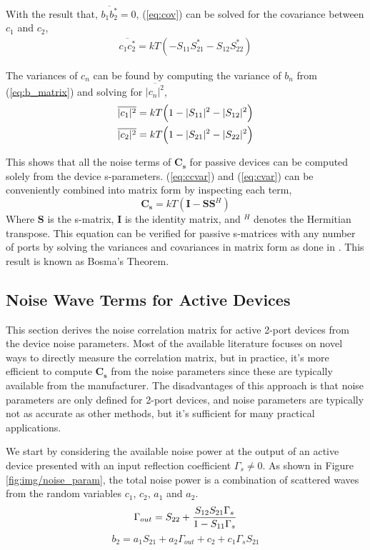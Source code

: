 \documentclass[journal]{IEEEtran}
\begin{document}
With the result that, \(\overline{b_1 b_2^*} = 0\), (\ref{eq:cov}) can be solved for the covariance between \(c_1\) and \(c_2\),
\begin{gather}
\overline{c_1c_2^*} = kT\left( -S_{11}S_{21}^* - S_{12}S_{22}^*\right) \label{eq:ccvar}
\end{gather}

The variances of \(c_n\) can be found by computing the variance of \(b_n\) from (\ref{eq:b_matrix}) and solving for \(\overline{|c_n|^2}\),
\begin{gather}
	\overline{|c_1|^2} = kT\Big(1- |S_{11}|^2 - |S_{12}|^2\Big) \notag \\
	\overline{|c_2|^2} = kT\Big(1- |S_{21}|^2 - |S_{22}|^2\Big) \label{eq:cvar}
\end{gather}

This shows that all the noise terms of \(\mathbf{C_s}\) for passive devices can be computed solely from the device s-parameters. (\ref{eq:ccvar}) and (\ref{eq:cvar}) can be conveniently combined into matrix form by inspecting each term,
\[\mathbf{C_s} = kT ( \mathbf{I} - \mathbf{S}\mathbf{S}^H ) \]
Where \(\mathbf{S}\) is the s-matrix, \(\mathbf{I}\) is the identity matrix, and \(^H\) denotes the Hermitian transpose. This equation can be verified for passive s-matrices with any number of ports by solving the variances and covariances in matrix form as done in \cite{b7}. This result is known as Bosma's Theorem. \cite{b6}


\subsection{Noise Wave Terms for Active Devices}
This section derives the noise correlation matrix for active 2-port devices from the device noise parameters. Most of the available literature focuses on novel ways to directly measure the correlation matrix, but in practice, it's more efficient to compute \(\mathbf{C_s}\) from the noise parameters since these are typically available from the manufacturer. The disadvantages of this approach is that noise parameters are only defined for 2-port devices, and noise parameters are typically not as accurate as other methods, but it's sufficient for many practical applications.

We start by considering the available noise power at the output of an active device presented with an input reflection coefficient \(\Gamma_s \neq 0\). As shown in Figure \ref{fig:img/noise_param}, the total noise power is a combination of scattered waves from the random variables \(c_1\), \(c_2\), \(a_1\) and \(a_2\).
\texenv\figure[file=img/noise_param, caption={\small Output noise from an RF amplifier when presented with a input reflection \(\Gamma_s\)}., width=3in, placement=b]
%
\[\Gamma_{out} = S_{22} + {S_{12}S_{21} \Gamma_s \over 1 - S_{11} \Gamma_s} \]
%
\[b_2 = a_1 S_{21} + a_2 \Gamma_{out} + c_2 + c_1\Gamma_s S_{21}\]
\end{document}
